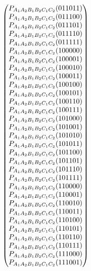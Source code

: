 \documentclass[aps,english,superscriptaddress,onecolumn,twoside,longbibliography,pra,floatfix,fleqn,nofootinbib]{revtex4-1}%
\theoremstyle{definition}
\newcommand{\p}[2][]{{P_{#1}}\parenths{#2}}
\DeclarePairedDelimiter{\parenths}{\lparen}{\rparen}
\begin{document}
\begin{align}
{\begin{pmatrix}
 \p[A_1 A_2 B_1 B_2 C_1 C_2]{0 1 1 0 1 1} \\
 \p[A_1 A_2 B_1 B_2 C_1 C_2]{0 1 1 1 0 0} \\
 \p[A_1 A_2 B_1 B_2 C_1 C_2]{0 1 1 1 0 1} \\
 \p[A_1 A_2 B_1 B_2 C_1 C_2]{0 1 1 1 1 0} \\
 \p[A_1 A_2 B_1 B_2 C_1 C_2]{0 1 1 1 1 1} \\
 \p[A_1 A_2 B_1 B_2 C_1 C_2]{1 0 0 0 0 0} \\
 \p[A_1 A_2 B_1 B_2 C_1 C_2]{1 0 0 0 0 1} \\
 \p[A_1 A_2 B_1 B_2 C_1 C_2]{1 0 0 0 1 0} \\
 \p[A_1 A_2 B_1 B_2 C_1 C_2]{1 0 0 0 1 1} \\
 \p[A_1 A_2 B_1 B_2 C_1 C_2]{1 0 0 1 0 0} \\
 \p[A_1 A_2 B_1 B_2 C_1 C_2]{1 0 0 1 0 1} \\
 \p[A_1 A_2 B_1 B_2 C_1 C_2]{1 0 0 1 1 0} \\
 \p[A_1 A_2 B_1 B_2 C_1 C_2]{1 0 0 1 1 1} \\
 \p[A_1 A_2 B_1 B_2 C_1 C_2]{1 0 1 0 0 0} \\
 \p[A_1 A_2 B_1 B_2 C_1 C_2]{1 0 1 0 0 1} \\
 \p[A_1 A_2 B_1 B_2 C_1 C_2]{1 0 1 0 1 0} \\
 \p[A_1 A_2 B_1 B_2 C_1 C_2]{1 0 1 0 1 1} \\
 \p[A_1 A_2 B_1 B_2 C_1 C_2]{1 0 1 1 0 0} \\
 \p[A_1 A_2 B_1 B_2 C_1 C_2]{1 0 1 1 0 1} \\
 \p[A_1 A_2 B_1 B_2 C_1 C_2]{1 0 1 1 1 0} \\
 \p[A_1 A_2 B_1 B_2 C_1 C_2]{1 0 1 1 1 1} \\
 \p[A_1 A_2 B_1 B_2 C_1 C_2]{1 1 0 0 0 0} \\
 \p[A_1 A_2 B_1 B_2 C_1 C_2]{1 1 0 0 0 1} \\
 \p[A_1 A_2 B_1 B_2 C_1 C_2]{1 1 0 0 1 0} \\
 \p[A_1 A_2 B_1 B_2 C_1 C_2]{1 1 0 0 1 1} \\
 \p[A_1 A_2 B_1 B_2 C_1 C_2]{1 1 0 1 0 0} \\
 \p[A_1 A_2 B_1 B_2 C_1 C_2]{1 1 0 1 0 1} \\
 \p[A_1 A_2 B_1 B_2 C_1 C_2]{1 1 0 1 1 0} \\
 \p[A_1 A_2 B_1 B_2 C_1 C_2]{1 1 0 1 1 1} \\
 \p[A_1 A_2 B_1 B_2 C_1 C_2]{1 1 1 0 0 0} \\
 \p[A_1 A_2 B_1 B_2 C_1 C_2]{1 1 1 0 0 1} \\

\end{pmatrix}}
\end{align}
\end{document}
